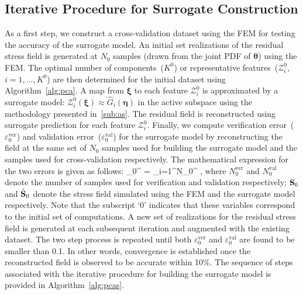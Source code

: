 \subsection{Iterative Procedure for Surrogate Construction}
\label{sub:pcas}

As a first step, we construct a cross-validation dataset using the FEM
 for testing the accuracy of the surrogate model. 
An initial set realizations of the residual stress field is generated at $N_0$ samples 
(drawn from the joint PDF of $\bm{\theta}$) using the FEM. 
The optimal number of components~($K^0$) or representative features~($\mathcal{Z}_i^0$, $i=1,\ldots,K^0$)
are then determined for
the initial dataset using Algorithm~\ref{alg:pca}. A map from $\bm{\xi}$ to each feature $\mathcal{Z}_i^0$
is approximated by a surrogate model: $\mathcal{Z}_i^0(\bm{\xi})\approx 
\hat{G}_i(\bm{\eta})$ in the active subspace using
the methodology presented in~\ref{sub:as}. The residual field is reconstructed using surrogate 
prediction for each feature $\mathcal{Z}_i^0$. Finally, we compute verification error~($\varepsilon_0^{\text{ver}}$)
and validation error~($\varepsilon_0^{\text{val}}$)
for the surrogate model by reconstructing the field at the same set of $N_0$
samples used for building the surrogate model and the samples used for cross-validation respectively. 
The mathematical expression for the two errors is given as
follows:
%
\be
\varepsilon_0^{} = 
\sum\limits_{i=1}^{N_0^{}} ,
\label{eq:check}
\ee
%
where $N_0^{\text{ver}}$ and $N_0^{\text{val}}$ denote the number of samples used for verification and validation
respectively; $\mathbf{{S}}_0$ and $\hat{\mathbf{{S}}}_0$ denote the stress field simulated using the FEM and the 
surrogate model respectively. Note that the subscript `0' indicates that these variables correspond to the initial set
of computations. 
A new set of realizations for the residual stress field is generated at each subsequent iteration
and augmented with the existing dataset. The two step process is repeated until both $\varepsilon_0^{\text{ver}}$
and $\varepsilon_0^{\text{val}}$ are found to be smaller than 0.1. In other words, convergence is established 
once the reconstructed field is observed to be accurate within 10$\%$. 
The sequence of steps associated with the iterative procedure for building the surrogate model is provided in
Algorithm~\ref{alg:pcas}. 
%
